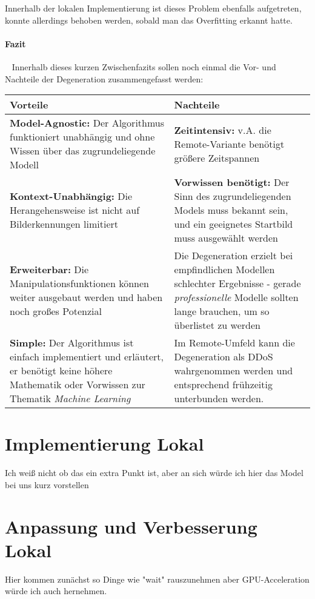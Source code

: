 Innerhalb der lokalen Implementierung ist dieses Problem ebenfalls aufgetreten, konnte allerdings behoben werden, sobald man das Overfitting erkannt hatte. 
\paragraph{Fazit} ~\newline
Innerhalb dieses kurzen Zwischenfazits sollen noch einmal die Vor- und Nachteile der Degeneration zusammengefasst werden: ~\newline ~\newline  
\begin{tabular}{|p{7.5cm}|p{7.5cm}|}
	\hline 
	\textbf{Vorteile} & \textbf{Nachteile} \\ 
	\hline 
	\textbf{Model-Agnostic:} Der Algorithmus funktioniert unabhängig und ohne Wissen über das zugrundeliegende Modell & \textbf{Zeitintensiv:} \newline v.A. die Remote-Variante benötigt größere Zeitspannen \\ 
	\hline 
	\textbf{Kontext-Unabhängig:} Die Herangehensweise ist nicht auf Bilderkennungen limitiert & \textbf{Vorwissen benötigt:} Der Sinn des zugrundeliegenden Models muss bekannt sein, und ein geeignetes Startbild muss ausgewählt werden  \\ 
	\hline 
	\textbf{Erweiterbar:} Die Manipulationsfunktionen können weiter ausgebaut werden und haben noch großes Potenzial & Die Degeneration erzielt bei empfindlichen Modellen schlechter Ergebnisse - gerade \textit{professionelle} Modelle sollten lange brauchen, um so überlistet zu werden \\ 
	\hline 
	\textbf{Simple:} Der Algorithmus ist einfach implementiert und erläutert, er benötigt keine höhere Mathematik oder Vorwissen zur Thematik \textit{Machine Learning}& Im Remote-Umfeld kann die Degeneration als DDoS wahrgenommen werden und entsprechend frühzeitig unterbunden werden. \\ 
	\hline 
\end{tabular}

\newpage
\section{Implementierung Lokal}
Ich weiß nicht ob das ein extra Punkt ist, aber an sich würde ich hier das Model bei uns kurz vorstellen

\section{Anpassung und Verbesserung Lokal}
Hier kommen zunächst so Dinge wie "wait" rauszunehmen aber GPU-Acceleration würde ich auch hernehmen. 
